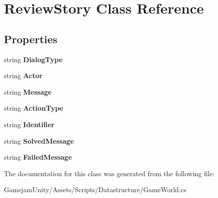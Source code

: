 \hypertarget{class_review_story}{}\section{Review\+Story Class Reference}
\label{class_review_story}
\subsection*{Properties}
\begin{DoxyCompactItemize}
\item 
\mbox{\label{class_review_story_ad4d6897fe849b171697ab5816dd36009}} 
string {\bfseries Dialog\+Type}
\item 
\mbox{\label{class_review_story_ad7873b2f0e6602d0ce083d2cf11ef835}} 
string {\bfseries Actor}
\item 
\mbox{\label{class_review_story_a5f24c4aa8af6a38e9b4f247ce339e0fb}} 
string {\bfseries Message}
\item 
\mbox{\label{class_review_story_a92bee9ea9581da16b7d88092d3d508b5}} 
string {\bfseries Action\+Type}
\item 
\mbox{\label{class_review_story_ae94bf398a972a3046ec6b52eaeafcc3a}} 
string {\bfseries Identifier}
\item 
\mbox{\label{class_review_story_a4cde94205919a05dfddbdc0dc3f88f36}} 
string {\bfseries Solved\+Message}
\item 
\mbox{\label{class_review_story_af28cd30c596761a48a6db8e4fd616071}} 
string {\bfseries Failed\+Message}
\end{DoxyCompactItemize}


The documentation for this class was generated from the following file\+:\begin{DoxyCompactItemize}
\item 
Gamejam\+Unity/\+Assets/\+Scripts/\+Datastructure/Game\+World.\+cs\end{DoxyCompactItemize}

